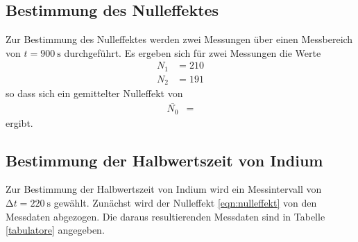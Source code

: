 
\subsection{Bestimmung des Nulleffektes}
Zur Bestimmung des Nulleffektes werden zwei Messungen über einen Messbereich von $t = \SI{900}{\second}$ durchgeführt.
Es ergeben sich für zwei Messungen die Werte
\begin{align*}
  N_1 &= \num{210} \\
  N_2 &= \num{191}
\end{align*}
so dass sich ein gemittelter Nulleffekt von
\begin{align}
  \bar{N_0}&= 
  \label{eqn:nulleffekt}
\end{align}
ergibt.

\subsection{Bestimmung der Halbwertszeit von Indium}

Zur Bestimmung der Halbwertszeit von Indium wird ein Messintervall von $\increment t = \SI{220}{\second}$ gewählt.
Zunächst wird der Nulleffekt \eqref{eqn:nulleffekt} von den Messdaten abgezogen.
Die daraus resultierenden Messdaten sind in Tabelle \ref{tabulatore} angegeben.

